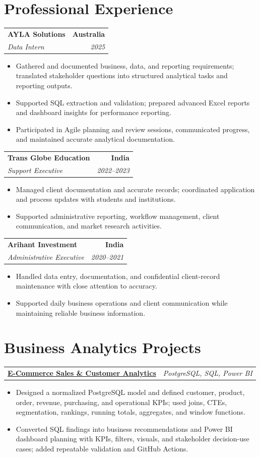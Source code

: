 \documentclass[letterpaper,10pt]{article}
\makeatletter
\newcommand{\role}[4]{%
  \begin{tabularx}{\textwidth}{@{}Xr@{}}
    \textbf{#1} & \textbf{#2} \\
    \textit{#3} & \textit{#4}
  \end{tabularx}\vspace{-1pt}
}
\newcommand{\project}[2]{%
  \begin{tabularx}{\textwidth}{@{}Xr@{}}
    \textbf{#1} & \textit{#2}
  \end{tabularx}\vspace{-1pt}
}
\makeatother
\begin{document}
\section{Professional Experience}
\role{AYLA Solutions}{Australia}{Data Intern}{2025}
\begin{itemize}
  \item Gathered and documented business, data, and reporting requirements; translated stakeholder questions into structured analytical tasks and reporting outputs.
  \item Supported SQL extraction and validation; prepared advanced Excel reports and dashboard insights for performance reporting.
  \item Participated in Agile planning and review sessions, communicated progress, and maintained accurate analytical documentation.
\end{itemize}
\vspace{1pt}

\role{Trans Globe Education}{India}{Support Executive}{2022--2023}
\begin{itemize}
  \item Managed client documentation and accurate records; coordinated application and process updates with students and institutions.
  \item Supported administrative reporting, workflow management, client communication, and market research activities.
\end{itemize}
\vspace{1pt}

\role{Arihant Investment}{India}{Administrative Executive}{2020--2021}
\begin{itemize}
  \item Handled data entry, documentation, and confidential client-record maintenance with close attention to accuracy.
  \item Supported daily business operations and client communication while maintaining reliable business information.
\end{itemize}

\section{Business Analytics Projects}
\project{\href{https://github.com/jainalimehta/Ecommerce-Sales-Analytics}{E-Commerce Sales \& Customer Analytics}}{PostgreSQL, SQL, Power BI}
\begin{itemize}
  \item Designed a normalized PostgreSQL model and defined customer, product, order, revenue, purchasing, and operational KPIs; used joins, CTEs, segmentation, rankings, running totals, aggregates, and window functions.
  \item Converted SQL findings into business recommendations and Power BI dashboard planning with KPIs, filters, visuals, and stakeholder decision-use cases; added repeatable validation and GitHub Actions.
\end{itemize}
\vspace{1pt}
\end{document}
